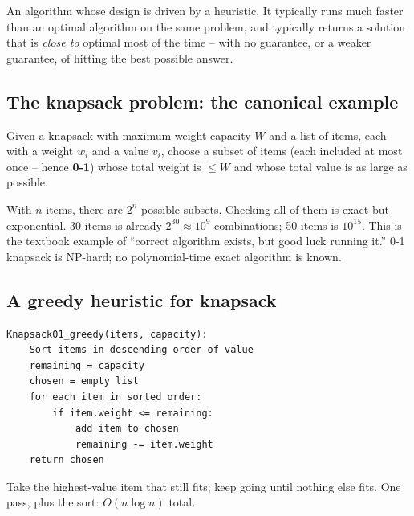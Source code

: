 \documentclass[11pt]{article}
\begin{document}
\begin{defnbox}
An algorithm whose design is driven by a heuristic. It typically runs
much faster than an optimal algorithm on the same problem, and
typically returns a solution that is \emph{close to} optimal most of
the time -- with no guarantee, or a weaker guarantee, of hitting the
best possible answer.
\end{defnbox}

\subsection{The knapsack problem: the canonical example}

\begin{defnbox}
Given a knapsack with maximum weight capacity $W$ and a list of
items, each with a weight $w_i$ and a value $v_i$, choose a subset of
items (each included at most once -- hence \textbf{0-1}) whose total
weight is $\le W$ and whose total value is as large as possible.
\end{defnbox}

\begin{notebox}
With $n$ items, there are $2^n$ possible subsets. Checking all of
them is exact but exponential. 30 items is already $2^{30}
\approx 10^9$ combinations; 50 items is $10^{15}$. This is the
textbook example of ``correct algorithm exists, but good luck
running it.'' 0-1 knapsack is NP-hard; no polynomial-time exact
algorithm is known.
\end{notebox}

\subsection{A greedy heuristic for knapsack}

\begin{examplebox}
\begin{verbatim}
Knapsack01_greedy(items, capacity):
    Sort items in descending order of value
    remaining = capacity
    chosen = empty list
    for each item in sorted order:
        if item.weight <= remaining:
            add item to chosen
            remaining -= item.weight
    return chosen
\end{verbatim}
Take the highest-value item that still fits; keep going until nothing
else fits. One pass, plus the sort: $O(n \log n)$ total.
\end{examplebox}
\end{document}

